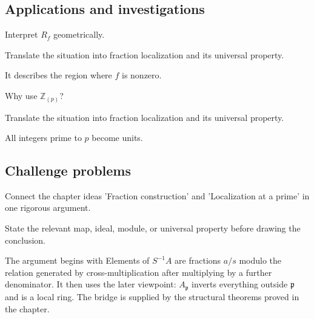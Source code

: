 \subsection*{Applications and investigations}

\begin{exercise}\label{exr:v06-expand-13}
Interpret $R_f$ geometrically.
\end{exercise}
\begin{hint}
Translate the situation into fraction localization and its universal property.
\end{hint}
\begin{solution}
It describes the region where $f$ is nonzero.
\end{solution}

\begin{exercise}\label{exr:v06-expand-14}
Why use $\mathbb Z_{(p)}$?
\end{exercise}
\begin{hint}
Translate the situation into fraction localization and its universal property.
\end{hint}
\begin{solution}
All integers prime to $p$ become units.
\end{solution}

\subsection*{Challenge problems}

\begin{exercise}\label{exr:v06-expand-15}
Connect the chapter ideas 'Fraction construction' and 'Localization at a prime' in one rigorous argument.
\end{exercise}
\begin{hint}
State the relevant map, ideal, module, or universal property before drawing the conclusion.
\end{hint}
\begin{solution}
The argument begins with Elements of $S^{-1}A$ are fractions $a/s$ modulo the relation generated by cross-multiplication after multiplying by a further denominator. It then uses the later viewpoint: $A_{\mathfrak p}$ inverts everything outside $\mathfrak p$ and is a local ring. The bridge is supplied by the structural theorems proved in the chapter.
\end{solution}

